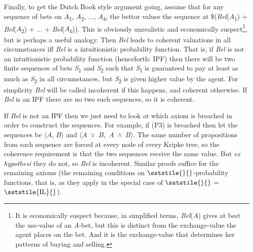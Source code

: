 Finally, to get the Dutch Book style argument going, assume that for any sequence of bets on \(A\)\textsubscript{1}, \(A\)\textsubscript{2}, ..., \(A\)\textit{\textsubscript{k}}, the bettor values the sequence at \$(\textit{Bel}(\(A\)\textsubscript{1}) + \textit{Bel}(\(A\)\textsubscript{2}) + ... + \textit{Bel}(\(A\)\textit{\textsubscript{k}})). This is obviously unrealistic and economically suspect\footnote{ It is economically suspect because, in simplified terms, \textit{Bel}(\(A\)) gives at best the use-value of an \(A\)\nobreakdash-bet, but this is distinct from the exchange\nobreakdash-value the agent places on the bet. And it is the exchange-value that determines her patterns of buying and selling.}, but is perhaps a useful analogy. Then \textit{Bel} leads to coherent valuations in all circumstances iff \textit{Bel} is a intuitionistic probability function. That is, if \textit{Bel} is not an intuitionistic probability function (henceforth: IPF) then there will be two finite sequences of bets \textit{S}\textsubscript{1} and \textit{S}\textsubscript{2} such that \textit{S}\textsubscript{1} is guaranteed to pay at least as much as \textit{S}\textsubscript{2} in all circumstances, but \textit{S}\textsubscript{2} is given higher value by the agent. For simplicity \textit{Bel} will be called incoherent if this happens, and coherent otherwise. If \textit{Bel} is an IPF there are no two such sequences, so it is coherent.

If \textit{Bel} is not an IPF then we just need to look at which axiom is breached in order to construct the sequences. For example, if (P3) is breached then let the sequences be {{\(\langle\)}}\(A\), \(B\){{\(\rangle\)}} and {{\(\langle\)}}\(A\)~${\vee}$~\(B\),~\textit{A~}${\wedge}$~\(B\){{\(\rangle\)}}. The same number of propositions from each sequence are forced at every node of every Kripke tree, so the coherence requirement is that the two sequences receive the same value. But \textit{ex hypothesi} they do not, so \textit{Bel} is incoherent. Similar proofs suffice for the remaining axioms (the remaining conditions on {\small \(\sststile{}{}\)}{}-probability functions, that is,\textit{ }as they apply in the special case of {\small \(\sststile{}{}\)} = {\small \(\sststile{\mathrm{IL}}{}\)}).

